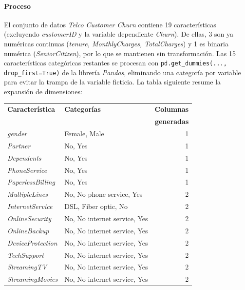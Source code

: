 \documentclass[spanish]{article}
\begin{document}
\paragraph{Proceso} El conjunto de datos \textit{Telco Customer Churn} contiene 19 características (excluyendo \textit{customerID} y la variable dependiente \textit{Churn}). De ellas, 3 son ya numéricas continuas (\textit{tenure, MonthlyCharges, TotalCharges}) y 1 es binaria numérica (\textit{SeniorCitizen}), por lo que se mantienen sin transformación. Las 15 características categóricas restantes se procesan con \texttt{pd.get\_dummies(..., drop\_first=True)} de la librería \textit{Pandas}, eliminando una categoría por variable para evitar la trampa de la variable ficticia. La tabla siguiente resume la expansión de dimensiones:

\begin{center}
\begin{tabular}{llr}
\toprule
\textbf{Característica} & \textbf{Categorías} & \textbf{Columnas} \\
  &   & \textbf{generadas} \\
\midrule
\textit{gender}           & Female, Male                            & 1 \\
\textit{Partner}          & No, Yes                                 & 1 \\
\textit{Dependents}       & No, Yes                                 & 1 \\
\textit{PhoneService}     & No, Yes                                 & 1 \\
\textit{PaperlessBilling} & No, Yes                                 & 1 \\
\textit{MultipleLines}    & No, No phone service, Yes               & 2 \\
\textit{InternetService}  & DSL, Fiber optic, No                    & 2 \\
\textit{OnlineSecurity}   & No, No internet service, Yes            & 2 \\
\textit{OnlineBackup}     & No, No internet service, Yes            & 2 \\
\textit{DeviceProtection} & No, No internet service, Yes            & 2 \\
\textit{TechSupport}      & No, No internet service, Yes            & 2 \\
\textit{StreamingTV}      & No, No internet service, Yes            & 2 \\
\textit{StreamingMovies}  & No, No internet service, Yes            & 2 \\

\end{tabular}
\end{center}
\end{document}
